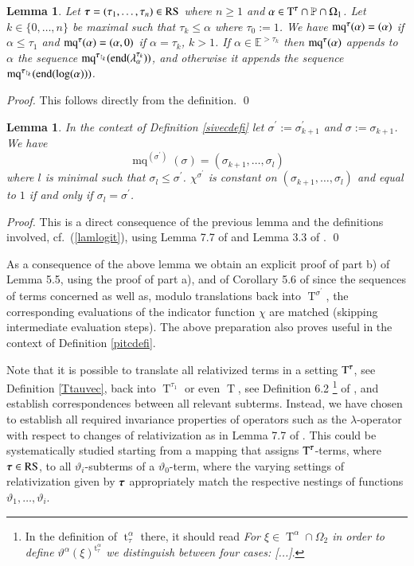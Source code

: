 \documentclass[3p,10pt,times]{elsarticle}
\newcommand{\al}{\alpha}
\newcommand{\la}{\lambda}
\newcommand{\Om}{\Omega}
\newcommand{\sipr}{\si^\prime}
\newcommand{\tauvec}{{\vec{\tau}}}
\newcommand{\si}{\sigma}
\newcommand{\tht}{\vartheta}
\newcommand{\Hz}{{\mathbb P}}
\newcommand{\Ez}{{\mathbb E}}
\newcommand{\sumend}{{\mathrm{end}}}
\newcommand{\thtnod}{\tht_0}
\newcommand{\thte}{\tht_1}
\newcommand{\thti}{\tht_i}
\newcommand{\thtal}{\tht^\al}
\newcommand{\T}{{\operatorname{T}}}
\newcommand{\Ttvec}{{\operatorname{T}^\tauvec}}
\newcommand{\Tal}{{\operatorname{T}^\al}}
\newcommand{\ttau}{{\operatorname{t}^\al_\tau}}
\newtheorem{lem}[theo]{Lemma}
\newcommand{\RS}{\mathrm{RS}}
\newcommand{\mq}{{\operatorname{mq}}}
\newcommand{\mqtvec}{{\operatorname{mq}^\tauvec}}
\def\vec#1{\mathchoice{\mbox{\boldmath$\displaystyle#1$}}
{\mbox{\boldmath$\textstyle#1$}}
{\mbox{\boldmath$\scriptstyle#1$}}
{\mbox{\boldmath$\scriptscriptstyle#1$}}}
\begin{document}
\begin{lem} Let $\tauvec=(\tau_1,\ldots,\tau_n)\in\RS$ where $n\ge 1$ and $\al\in\Ttvec\cap\Hz\cap\Om_1$.
Let $k\in\{0,\ldots,n\}$ be maximal such that $\tau_k\le\al$ where $\tau_0:=1$.
We have $\mqtvec(\al)=(\al)$ if $\al\le\tau_1$ and $\mqtvec(\al)=(\al,0)$ if $\al=\tau_k$, $k>1$.
If $\al\in\Ez^{>\tau_k}$ then $\mqtvec(\al)$ appends to $\al$ the sequence $\mq^{\tauvec_{\restriction_k}}(\sumend(\la^{\tau_k}_\al))$,
and otherwise it appends the sequence $\mq^{\tauvec_{\restriction_k}}(\sumend(\log(\al)))$.
\end{lem}
\begin{proof} This follows directly from the definition. \qed \end{proof}

\begin{lem}\label{simqchilem} In the context of Definition \ref{sivecdefi} let $\sipr:=\sipr_{k+1}$ and $\si:=\si_{k+1}$. We have 
\[\mq^{(\sipr)}(\si)=(\si_{k+1},\ldots,\si_l)\]
where $l$ is minimal such that $\si_l\le\sipr$.
$\chi^{\sipr}$ is constant on $(\si_{k+1},\ldots,\si_l)$ and equal to $1$ if and only if $\si_l=\sipr$.
\end{lem}
\begin{proof} This is a direct consequence of the previous lemma and the definitions involved, cf.\ (\ref{lamlogit}),
using Lemma 7.7 of \cite{W07a} and Lemma 3.3 of \cite{CWc}. \qed \end{proof}
\begin{rmk} As a consequence of the above lemma we obtain an explicit proof of part b) of Lemma 5.5, using the proof of part a), 
and of Corollary 5.6 of \cite{CWc} since the sequences of terms concerned as well as, modulo translations back into $\T^{\sipr}$, 
the corresponding evaluations of the indicator function $\chi$ are matched (skipping intermediate evaluation steps). 
The above preparation also proves useful in the context of Definition \ref{pitcdefi}. 
\end{rmk}

Note that it is possible to translate all relativized terms in a setting $\Ttvec$, see Definition \ref{Ttauvec}, 
back into $\T^{\tau_1}$ or even $\T$, see Definition 6.2
\footnote{In the definition of $\ttau$ there, it should read \emph{For $\xi\in\Tal\cap\Om_2$ in order to define 
$\thtal(\xi)^\ttau$ we distinguish between four cases: [...]}.}
of \cite{W07a}, and establish correspondences between all relevant
subterms. Instead, we have chosen to establish all required invariance properties of operators such as the $\la$-operator with respect
to changes of relativization as in Lemma 7.7 of \cite{W07a}. This could be systematically studied starting from a mapping that 
assigns $\Ttvec$-terms, where $\tauvec\in\RS$, to all $\thti$-subterms of a $\thtnod$-term, where the varying settings of relativization 
given by $\tauvec$ appropriately match the respective nestings of functions $\thte,\ldots,\thti$. 
\end{document}
